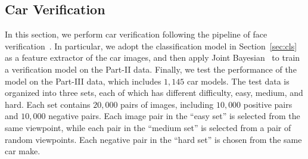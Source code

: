 \documentclass[10pt,twocolumn,letterpaper]{article}
\begin{document}
\subsection{Car Verification}\label{sec:verif}
In this section, we perform car verification following the pipeline of face verification~\cite{Sun14}.
%
In particular, we adopt the classification model in Section~\ref{sec:cls} as a feature extractor of the car images, and then apply Joint Bayesian~\cite{Chen12} to train a verification model on the Part-II data. Finally, we test the performance of the model on the Part-III data, which includes $1,145$ car models.
%
The test data is organized into three sets, each of which has different difficulty, \ie easy, medium, and hard. Each set contains $20,000$ pairs of images, including $10,000$ positive pairs and $10,000$ negative pairs.
%
Each image pair in the ``easy set'' is selected from the same viewpoint, while each pair in the ``medium set'' is selected from a pair of random viewpoints. Each negative pair in the ``hard set'' is chosen from the same car make.
\end{document}

